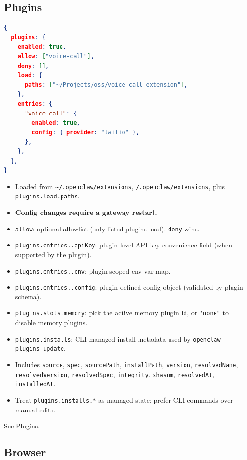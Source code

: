 \hrulefill


\subsection{Plugins}


\begin{lstlisting}[language=json]
{
  plugins: {
    enabled: true,
    allow: ["voice-call"],
    deny: [],
    load: {
      paths: ["~/Projects/oss/voice-call-extension"],
    },
    entries: {
      "voice-call": {
        enabled: true,
        config: { provider: "twilio" },
      },
    },
  },
}
\end{lstlisting}


\begin{itemize}
  \item Loaded from \texttt{\textasciitilde{}/.openclaw/extensions}, \texttt{/.openclaw/extensions}, plus \texttt{plugins.load.paths}.
  \item \textbf{Config changes require a gateway restart.}
  \item \texttt{allow}: optional allowlist (only listed plugins load). \texttt{deny} wins.
  \item \texttt{plugins.entries..apiKey}: plugin-level API key convenience field (when supported by the plugin).
  \item \texttt{plugins.entries..env}: plugin-scoped env var map.
  \item \texttt{plugins.entries..config}: plugin-defined config object (validated by plugin schema).
  \item \texttt{plugins.slots.memory}: pick the active memory plugin id, or \texttt{"none"} to disable memory plugins.
  \item \texttt{plugins.installs}: CLI-managed install metadata used by \texttt{openclaw plugins update}.
  \item Includes \texttt{source}, \texttt{spec}, \texttt{sourcePath}, \texttt{installPath}, \texttt{version}, \texttt{resolvedName}, \texttt{resolvedVersion}, \texttt{resolvedSpec}, \texttt{integrity}, \texttt{shasum}, \texttt{resolvedAt}, \texttt{installedAt}.
  \item Treat \texttt{plugins.installs.*} as managed state; prefer CLI commands over manual edits.
\end{itemize}


See \href{/tools/plugin}{Plugins}.

\hrulefill


\subsection{Browser}


